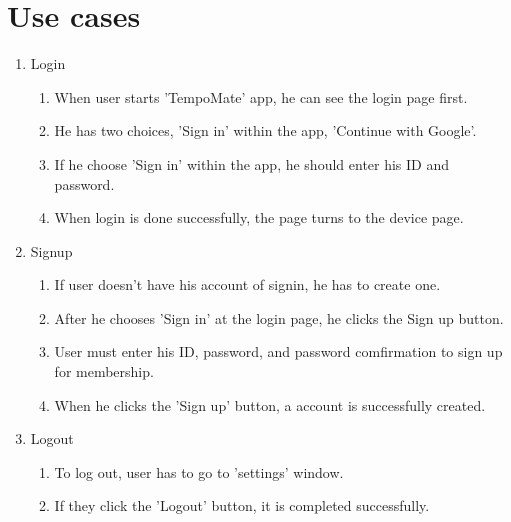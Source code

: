 \newpage
\section{\Large{Use cases}}

\begin{enumerate}[label=\arabic*]
    \item Login
          \begin{enumerate}
              \item When user starts 'TempoMate' app, he can see the login page first. \\
              \item He has two choices, 'Sign in' within the app, 'Continue with Google'. \\
              \item If he choose 'Sign in' within the app, he should enter his ID and password. \\
              \item When login is done successfully, the page turns to the device page. \\
          \end{enumerate}

    \item Signup
          \begin{enumerate}
              \item If user doesn't have his account of signin, he has to create one. \\
              \item After he chooses 'Sign in' at the login page, he clicks the Sign up button. \\
              \item User must enter his ID, password, and password comfirmation to sign up for membership. \\
              \item When he clicks the 'Sign up' button, a account is successfully created. \\
          \end{enumerate}

    \item Logout
          \begin{enumerate}
              \item To log out, user has to go to 'settings' window.\\
              \item If they click the 'Logout' button, it is completed successfully.\\
          \end{enumerate}
\end{enumerate}

